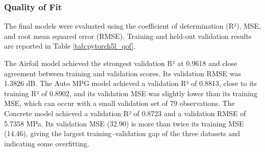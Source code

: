 \documentclass{article}
\begin{document}
\subsubsection{Quality of Fit}
The final models were evaluated using the coefficient of determination (R²), MSE, and root mean squared error (RMSE). Training and held-out validation results are reported in Table \ref{tab:pytorch5l_qof}.
\begin{table}[H]
    \centering
    \caption{PyTorch 5L Neural Network Quality of Fit Results}
    \label{tab:pytorch5l_qof}
    \small
\end{table}

The Airfoil model achieved the strongest validation R² at 0.9618 and close agreement between training and validation scores. Its validation RMSE was 1.3826 dB. The Auto MPG model achieved a validation R² of 0.8813, close to its training R² of 0.8902, and its validation MSE was slightly lower than its training MSE, which can occur with a small validation set of 79 observations. The Concrete model achieved a validation R² of 0.8723 and a validation RMSE of 5.7358 MPa. Its validation MSE (32.90) is more than twice its training MSE (14.46), giving the largest training--validation gap of the three datasets and indicating some overfitting.
\medskip
\end{document}
